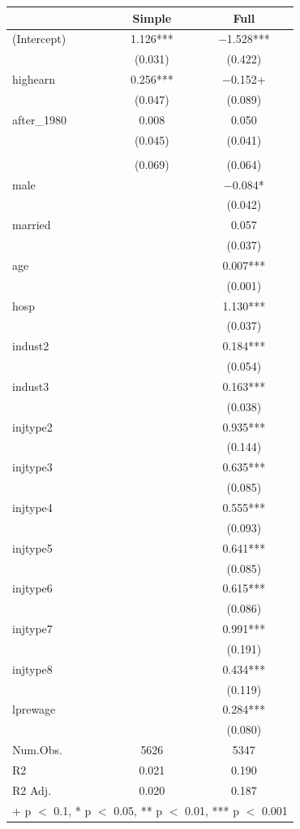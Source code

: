 \documentclass[
  letterpaper,
  DIV=11,
  numbers=noendperiod]{scrartcl}
\begin{document}
\begin{table}
\centering
\begin{tabular}[t]{lcc}
\toprule
  & Simple & Full\\
\midrule
(Intercept) & \num{1.126}*** & \num{-1.528}***\\
 & (\num{0.031}) & (\num{0.422})\\
highearn & \num{0.256}*** & \num{-0.152}+\\
 & (\num{0.047}) & (\num{0.089})\\
after\_1980 & \num{0.008} & \num{0.050}\\
 & (\num{0.045}) & (\num{0.041})\\
\cellcolor[HTML]{F6D645}{highearn × after\_1980} & \cellcolor[HTML]{F6D645}{\num{0.191}**} & \cellcolor[HTML]{F6D645}{\num{0.169}**}\\
 & (\num{0.069}) & (\num{0.064})\\
male &  & \num{-0.084}*\\
 &  & (\num{0.042})\\
married &  & \num{0.057}\\
 &  & \vphantom{1} (\num{0.037})\\
age &  & \num{0.007}***\\
 &  & (\num{0.001})\\
hosp &  & \num{1.130}***\\
 &  & (\num{0.037})\\
indust2 &  & \num{0.184}***\\
 &  & (\num{0.054})\\
indust3 &  & \num{0.163}***\\
 &  & (\num{0.038})\\
injtype2 &  & \num{0.935}***\\
 &  & (\num{0.144})\\
injtype3 &  & \num{0.635}***\\
 &  & \vphantom{1} (\num{0.085})\\
injtype4 &  & \num{0.555}***\\
 &  & (\num{0.093})\\
injtype5 &  & \num{0.641}***\\
 &  & (\num{0.085})\\
injtype6 &  & \num{0.615}***\\
 &  & (\num{0.086})\\
injtype7 &  & \num{0.991}***\\
 &  & (\num{0.191})\\
injtype8 &  & \num{0.434}***\\
 &  & (\num{0.119})\\
lprewage &  & \num{0.284}***\\
 &  & (\num{0.080})\\
\midrule
Num.Obs. & \num{5626} & \num{5347}\\
R2 & \num{0.021} & \num{0.190}\\
R2 Adj. & \num{0.020} & \num{0.187}\\
\bottomrule
\multicolumn{3}{l}{\rule{0pt}{1em}+ p $<$ 0.1, * p $<$ 0.05, ** p $<$ 0.01, *** p $<$ 0.001}\\
\end{tabular}
\end{table}
\end{document}
